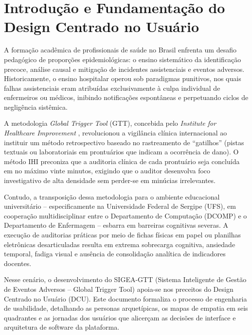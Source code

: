 \chapter{Introdução e Fundamentação do Design Centrado no Usuário}
\label{cap_introducao_fundamentacao}

A formação acadêmica de profissionais de saúde no Brasil enfrenta um desafio pedagógico de proporções epidemiológicas: o ensino sistemático da identificação precoce, análise causal e mitigação de incidentes assistenciais e eventos adversos. Historicamente, o ensino hospitalar operou sob paradigmas punitivos, nos quais falhas assistenciais eram atribuídas exclusivamente à culpa individual de enfermeiros ou médicos, inibindo notificações espontâneas e perpetuando ciclos de negligência sistêmica.

A metodologia \textit{Global Trigger Tool} (GTT), concebida pelo \textit{Institute for Healthcare Improvement} \cite{ihi2009}, revolucionou a vigilância clínica internacional ao instituir um método retrospectivo baseado no rastreamento de ``gatilhos'' (pistas textuais ou laboratoriais em prontuários que indicam a ocorrência de dano). O método IHI preconiza que a auditoria clínica de cada prontuário seja concluída em no máximo vinte minutos, exigindo que o auditor desenvolva foco investigativo de alta densidade sem perder-se em minúcias irrelevantes.

Contudo, a transposição dessa metodologia para o ambiente educacional universitário -- especificamente na Universidade Federal de Sergipe (UFS), em cooperação multidisciplinar entre o Departamento de Computação (DCOMP) e o Departamento de Enfermagem -- esbarra em barreiras cognitivas severas. A execução de auditorias práticas por meio de fichas físicas em papel ou planilhas eletrônicas desarticuladas resulta em extrema sobrecarga cognitiva, ansiedade temporal, fadiga visual e ausência de consolidação analítica de indicadores docentes.

Nesse cenário, o desenvolvimento do SIGEA-GTT (Sistema Inteligente de Gestão de Eventos Adversos -- Global Trigger Tool) apoia-se nos preceitos do Design Centrado no Usuário (DCU). Este documento formaliza o processo de engenharia de usabilidade, detalhando as personas arquetípicas, os mapas de empatia em seis quadrantes e as jornadas dos usuários que alicerçam as decisões de interface e arquitetura de software da plataforma.

